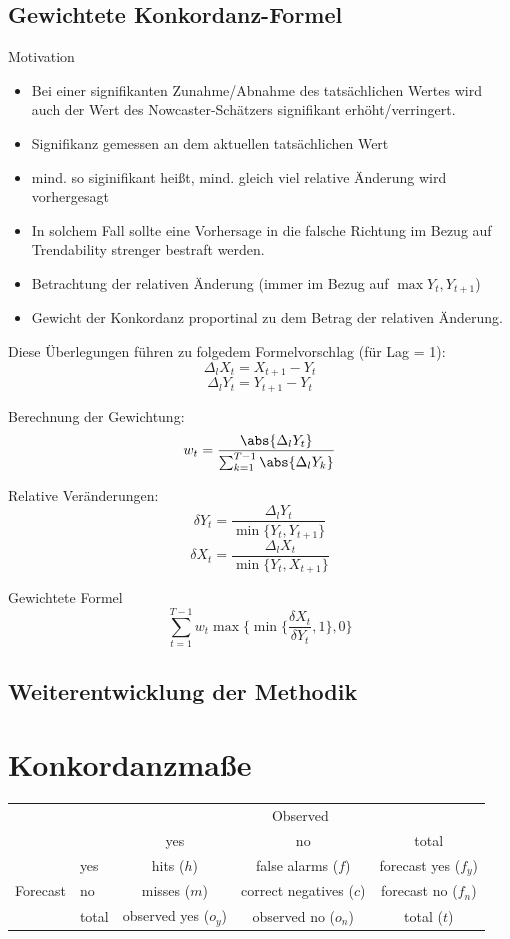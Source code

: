 \documentclass{article}
\theoremstyle{plain}%
\theoremstyle{definition}
\newcommand{\lag}[1][l]{\Delta_{#1}}
\DeclarePairedDelimiter{\abs}\lvert\rvert
\begin{document}
\subsection{Gewichtete Konkordanz-Formel}

Motivation

\begin{itemize}
    \item Bei einer signifikanten Zunahme/Abnahme des tatsächlichen Wertes wird auch der Wert des Nowcaster-Schätzers signifikant erhöht/verringert.
    \item Signifikanz gemessen an dem aktuellen tatsächlichen Wert
    \item mind. so siginifikant heißt, mind. gleich viel relative Änderung wird vorhergesagt
    \item In solchem Fall sollte eine Vorhersage in die falsche Richtung im Bezug auf Trendability strenger bestraft werden.
    \item Betrachtung der relativen Änderung (immer im Bezug auf $\max{Y_t, Y_{t+1}}$)
    \item Gewicht der Konkordanz proportinal zu dem Betrag der relativen Änderung.
\end{itemize}

Diese Überlegungen führen zu folgedem Formelvorschlag (für Lag = 1): 
\[\lag X_t = X_{t+1}-Y_{t}\]
\[\lag Y_t = Y_{t+1}-Y_{t}\]

Berechnung der Gewichtung: 
\[w_t=\frac{\abs{\lag Y_t}}{\sum_{k=1}^{T-1}\abs{\lag Y_k}}\]

Relative Veränderungen:
\[\delta Y_t = \frac{\lag Y_t}{\min\{Y_t, Y_{t+1}\}} \]
\[\delta X_t = \frac{\lag X_t}{\min\{Y_t, X_{t+1}\}} \]

Gewichtete Formel
\begin{equation}
  \sum_{t = 1}^{T - 1} w_t \max\{\min\{\frac{\delta X_t}{\delta Y_t},1\},0\}
\end{equation}

\subsection{Weiterentwicklung der Methodik}

\newpage
\section{Konkordanzmaße}

\begin{tabular}{l l c c c}
	\toprule
	& & \multicolumn{3}{c}{Observed} \\
	& & yes & no & total \\	\cline{3-5}
	\multirow{3}{*}{Forecast} & yes & hits ($h$) & false alarms ($f$) & forecast yes ($f_y$) \\
	& no & misses ($m$) & correct negatives ($c$) & forecast no ($f_n$) \\
	& total & observed yes ($o_y$) & observed no ($o_n$) & total ($t$) \\
	\bottomrule
\end{tabular}
\end{document}

